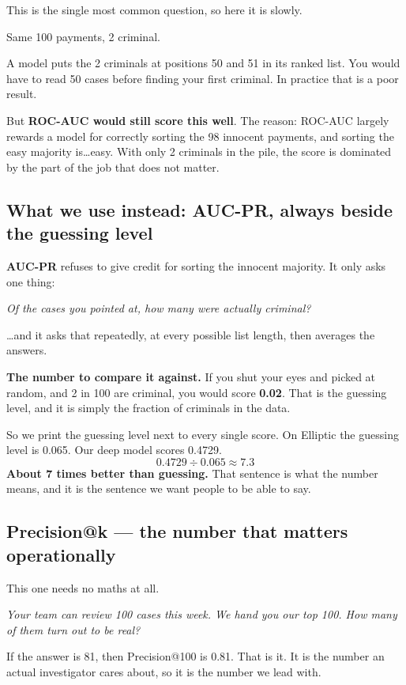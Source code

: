 \documentclass[11pt,a4paper]{article}
\begin{document}
This is the single most common question, so here it is slowly.

\begin{plain}
Same 100 payments, 2 criminal.

A model puts the 2 criminals at positions 50 and 51 in its ranked list. You would
have to read 50 cases before finding your first criminal. In practice that is a
poor result.

But \textbf{ROC-AUC would still score this well}. The reason: ROC-AUC largely
rewards a model for correctly sorting the 98 innocent payments, and sorting the
easy majority is\ldots easy. With only 2 criminals in the pile, the score is
dominated by the part of the job that does not matter.
\end{plain}

\subsection{What we use instead: AUC-PR, always beside the guessing level}

\begin{plain}
\textbf{AUC-PR} refuses to give credit for sorting the innocent majority. It only
asks one thing:

\begin{center}
\emph{Of the cases you pointed at, how many were actually criminal?}
\end{center}

\ldots and it asks that repeatedly, at every possible list length, then averages
the answers.

\textbf{The number to compare it against.} If you shut your eyes and picked at
random, and 2 in 100 are criminal, you would score \textbf{0.02}. That is the
guessing level, and it is simply the fraction of criminals in the data.

So we print the guessing level next to every single score. On Elliptic the
guessing level is 0.065. Our deep model scores 0.4729.
\[
0.4729 \div 0.065 \approx 7.3
\]
\textbf{About 7 times better than guessing.} That sentence is what the number
means, and it is the sentence we want people to be able to say.
\end{plain}

\subsection{Precision@k --- the number that matters operationally}

\begin{plain}
This one needs no maths at all.

\emph{Your team can review 100 cases this week. We hand you our top 100. How many
of them turn out to be real?}

If the answer is 81, then Precision@100 is 0.81. That is it. It is the number an
actual investigator cares about, so it is the number we lead with.
\end{plain}
\end{document}
